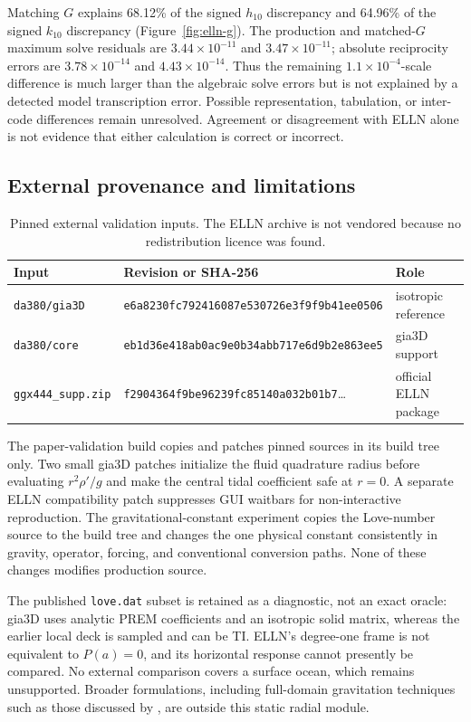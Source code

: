 \documentclass[11pt,a4paper]{article}
\newcommand{\code}[1]{\texttt{#1}}
\begin{document}
Matching \(G\) explains 68.12\% of the signed \(h_{10}\) discrepancy and
64.96\% of the signed \(k_{10}\) discrepancy
(Figure~\ref{fig:elln-g}).  The production and matched-\(G\) maximum solve
residuals are \(3.44\times10^{-11}\) and \(3.47\times10^{-11}\);
absolute reciprocity errors are \(3.78\times10^{-14}\) and
\(4.43\times10^{-14}\).  Thus the remaining \(1.1\times10^{-4}\)-scale
difference is much larger than the algebraic solve errors but is not explained
by a detected model transcription error.  Possible representation,
tabulation, or inter-code differences remain unresolved.  Agreement or
disagreement with ELLN alone is not evidence that either calculation is
correct or incorrect.

\subsection{External provenance and limitations}

\begin{table}[tb]
\centering
\caption{Pinned external validation inputs.  The ELLN archive is not
vendored because no redistribution licence was found.}
\label{tab:provenance}
\small
\begin{tabular}{lll}
\toprule
Input & Revision or SHA-256 & Role\\
\midrule
\code{da380/gia3D} &
\code{e6a8230fc792416087e530726e3f9f9b41ee0506} &
isotropic reference\\
\code{da380/core} &
\code{eb1d36e418ab0ac9e0b34abb717e6d9b2e863ee5} &
gia3D support\\
\code{ggx444\_supp.zip} &
\code{f2904364f9be96239fc85140a032b01b7}\ldots &
official ELLN package\\
\bottomrule
\end{tabular}
\end{table}

The paper-validation build copies and patches pinned sources in its build
tree only.  Two small gia3D patches initialize the fluid quadrature radius
before evaluating \(r^2\rho'/g\) and make the central tidal coefficient safe
at \(r=0\).  A separate ELLN compatibility patch suppresses GUI waitbars for
non-interactive reproduction.  The gravitational-constant experiment copies
the Love-number source to the build tree and changes the one physical
constant consistently in gravity, operator, forcing, and conventional
conversion paths.  None of these changes modifies production source.

The published \code{love.dat} subset is retained as a diagnostic, not an
exact oracle: gia3D uses analytic PREM coefficients and an isotropic solid
matrix, whereas the earlier local deck is sampled and can be TI.  ELLN's
degree-one frame is not equivalent to \(P(a)=0\), and its horizontal response
cannot presently be compared.  No external comparison covers a surface
ocean, which remains unsupported.  Broader formulations, including
full-domain gravitation techniques such as those discussed by
\citet{yu_et_al_2026}, are outside this static radial module.
\end{document}
